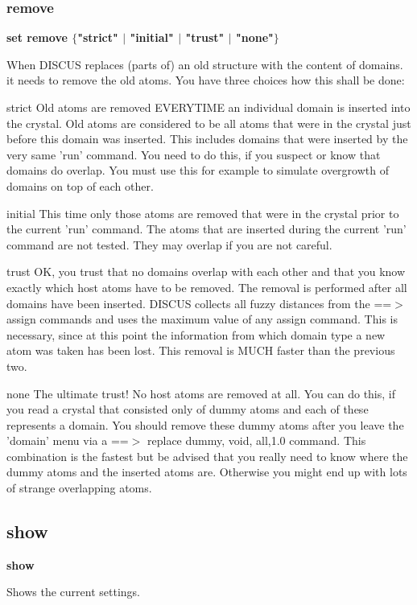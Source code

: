 \subsubsection{remove}
{\bf set remove $ \{$"strict" $| $ "initial" $| $ "trust" $| $ "none"$\} $ \par }
\par
\vspace{3pt}
When DISCUS replaces (parts of) an old structure with the 
content of domains. it needs to remove the old atoms. You have 
three choices how this shall be done: 
\par
strict 
Old atoms are removed EVERYTIME an individual domain is inserted 
into the crystal. Old atoms are considered to be all atoms that 
were in the crystal just before this domain was inserted. This 
includes domains that were inserted by the very same 'run' 
command. 
You need to do this, if you suspect or know that domains do 
overlap. You must use this for example to simulate overgrowth of 
domains on top of each other. 
\par
initial 
This time only those atoms are removed that were in the crystal 
prior to the current 'run' command. The atoms that are inserted 
during the current 'run' command are not tested. They may overlap 
if you are not careful. 
\par
trust 
OK, you trust that no domains overlap with each other and that you 
know exactly which host atoms have to be removed. The removal is 
performed after all domains have been inserted. DISCUS collects 
all fuzzy distances from the ==$> $ assign commands and uses the 
maximum value of any assign command. This is necessary, since at this 
point the information from which domain type a new atom was taken 
has been lost. 
This removal is MUCH faster than  the previous two. 
\par
none 
The ultimate trust! No host atoms are removed at all. You can do this, 
if you read a crystal that consisted only of dummy atoms and each of 
these represents a domain. 
You should remove these dummy atoms after you leave the 'domain' 
menu via a ==$> $ replace dummy, void, all,1.0 command. 
This combination is the fastest but be advised that you really need to 
know where the dummy atoms and the inserted atoms are. Otherwise you 
might end up with lots of strange overlapping atoms. 
\subsection*{show}
{\bf show \par }
\par
\vspace{3pt}
Shows the current settings. 
\par
